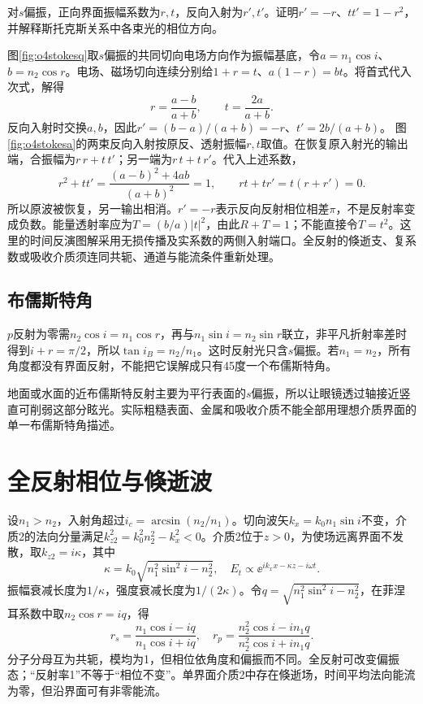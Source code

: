 \begin{example}\label{ex:o4stokes}
对$s$偏振，正向界面振幅系数为$r,t$，反向入射为$r',t'$。证明$r'=-r$、$tt'=1-r^2$，并解释斯托克斯关系中各束光的相位方向。
\end{example}
\begin{solution}
图\ref{fig:o4stokesq}取$s$偏振的共同切向电场方向作为振幅基底，令$a=n_1\cos i$、$b=n_2\cos r$。电场、磁场切向连续分别给$1+r=t$、$a(1-r)=bt$。将首式代入次式，解得
\[
 r=\frac{a-b}{a+b},\qquad t=\frac{2a}{a+b}.
\]
反向入射时交换$a,b$，因此$r'=(b-a)/(a+b)=-r$、$t'=2b/(a+b)$。
图\ref{fig:o4stokesa}的两束反向入射按原反、透射振幅$r,t$取值。在恢复原入射光的输出端，合振幅为$r\,r+t\,t'$；另一端为$r\,t+t\,r'$。代入上述系数，
\[
 r^2+tt'=\frac{(a-b)^2+4ab}{(a+b)^2}=1,
 \qquad rt+tr'=t(r+r')=0.
\]
所以原波被恢复，另一输出相消。$r'=-r$表示反向反射相位相差$\pi$，不是反射率变成负数。能量透射率应为$T=(b/a)|t|^2$，由此$R+T=1$；不能直接令$T=t^2$。这里的时间反演图解采用无损传播及实系数的两侧入射端口。全反射的倏逝支、复系数或吸收介质须连同共轭、通道与能流条件重新处理。
\end{solution}

\subsection{布儒斯特角}\label{th:o4brewster}
$p$反射为零需$n_2\cos i=n_1\cos r$，再与$n_1\sin i=n_2\sin r$联立，非平凡折射率差时得到$i+r=\pi/2$，所以$\tan i_B=n_2/n_1$。这时反射光只含$s$偏振。若$n_1=n_2$，所有角度都没有界面反射，不能把它误解成只有45度一个布儒斯特角。

地面或水面的近布儒斯特反射主要为平行表面的$s$偏振，所以让眼镜透过轴接近竖直可削弱这部分眩光。实际粗糙表面、金属和吸收介质不能全部用理想介质界面的单一布儒斯特角描述。

\section{全反射相位与倏逝波}\label{th:o4tir}
设$n_1>n_2$，入射角超过$i_c=\arcsin(n_2/n_1)$。切向波矢$k_x=k_0n_1\sin i$不变，介质2的法向分量满足$k_{z2}^2=k_0^2n_2^2-k_x^2<0$。介质2位于$z>0$，为使场远离界面不发散，取$k_{z2}=i\kappa$，其中
\[
 \kappa=k_0\sqrt{n_1^2\sin^2i-n_2^2},\quad
 E_t\propto\ee^{ik_xx-\kappa z-i\omega t}.
\]
振幅衰减长度为$1/\kappa$，强度衰减长度为$1/(2\kappa)$。令$q=\sqrt{n_1^2\sin^2i-n_2^2}$，在菲涅耳系数中取$n_2\cos r=iq$，得
\[
 r_s=\frac{n_1\cos i-iq}{n_1\cos i+iq},\quad
 r_p=\frac{n_2^2\cos i-in_1q}{n_2^2\cos i+in_1q}.
\]
分子分母互为共轭，模均为1，但相位依角度和偏振而不同。全反射可改变偏振态；“反射率1”不等于“相位不变”。单界面介质2中存在倏逝场，时间平均法向能流为零，但沿界面可有非零能流。

